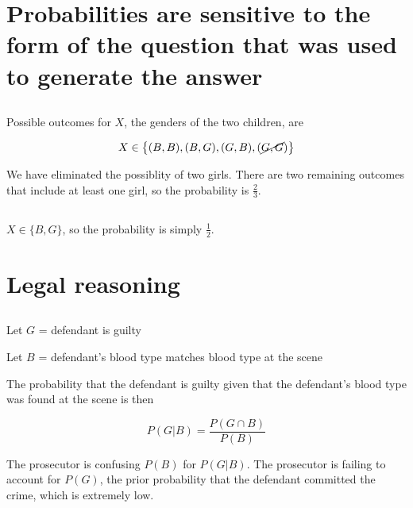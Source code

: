 \documentclass{article}
\begin{document}
\def\ci{\perp\!\!\!\perp}
\def\defeq{\buildrel\triangle\over =}
\def\E{\mathrm{E}}
\def\Var{\mathrm{Var}}
\def\Cov{\mathrm{Cov}}

\section{Probabilities are sensitive to the form of the question that
  was used to generate the answer}

\subsection{}

Possible outcomes for $X$, the genders of the two children, are

\[
X\in \left\{ (B,B), (B,G), (G,B), (\cancel{G,G})\right\}
\]

We have eliminated the possiblity of two girls. There are two
remaining outcomes that include at least one girl, so the probability is $\frac{2}{3}$.

\subsection{}

$X \in \{ B, G \}$, so the probability is simply $\frac{1}{2}$.

\section{Legal reasoning}

\subsection{}

\begin{list}{}{}
\item Let $G$ = defendant is guilty
\item Let $B$ = defendant's blood type matches blood type at the scene
\end{list}

The probability that the defendant is guilty given that the
defendant's blood type was found at the scene is then

\[ P(G|B) = \frac{P(G \cap B)}{P(B)} \]

The prosecutor is confusing $P(B)$ for $P(G|B)$. The prosecutor is failing
to account for $P(G)$, the prior probability that the defendant
committed the crime, which is extremely low.
\end{document}
